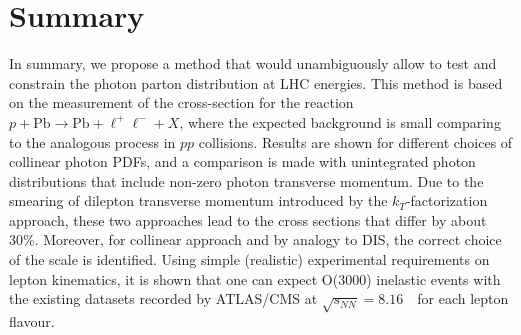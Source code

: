 \section{Summary}

In summary, we propose a method that would unambiguously allow to test and constrain the photon parton distribution at LHC energies.
This method is based on the measurement of the cross-section for the reaction $p+\textrm{Pb}\rightarrow \textrm{Pb} + \ell^+\ell^- + X$, where the expected background is small comparing to the analogous process in $pp$ collisions. 
Results are shown for different choices of collinear photon PDFs, and a comparison is made with unintegrated photon distributions that include non-zero photon transverse momentum.
Due to the smearing of dilepton transverse momentum introduced by the $k_T$-factorization approach, these two approaches lead to the cross sections that differ by about 30\%.
Moreover, for collinear approach and  by analogy to DIS, the correct choice of the scale is identified.
Using simple (realistic) experimental requirements on lepton kinematics, it is shown that one can expect O(3000) inelastic events with the existing datasets recorded by ATLAS/CMS at $\sqrt{s_{N N}} = 8.16$~\TeV\ for each lepton flavour.
